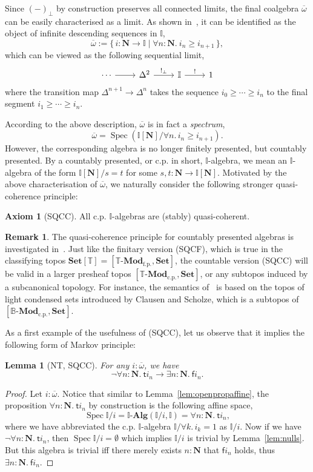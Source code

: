 \documentclass[12pt]{amsart}
\newtheorem{lemma}[theorem]{Lemma}
\theoremstyle{definition}
\newtheorem{remark}[theorem]{Remark}
\newtheorem{axiom}{Axiom}
\newcommand{\mb}[1]{\mathbf{#1}}
\newcommand{\mbb}[1]{\mathbb{#1}}
\newcommand{\T}{\mbb T}
\newcommand{\I}{\mbb I}
\newcommand{\mr}[1]{\mathrm{#1}}
\newcommand{\ms}[1]{\mathsf{#1}}
\newcommand{\Set}{\mb{Set}}
\newcommand{\alg}{\text{-}\mb{Alg}}
\newcommand{\ov}[1]{\overline{#1}}
\newcommand{\scomp}[2]{\{\,#1\mid#2\,\}}
\newcommand{\fp}{_{\mr{f.p.}}}
\newcommand{\cp}{_{\mr{c.p.}}}
\newcommand{\N}{\mb N}
\newcommand{\prt}{_{\bot}}
\newcommand{\fa}[2]{\forall #1\!\colon\!\!#2.\ }
\newcommand{\ex}[2]{\exists #1\!\colon\!\!#2.\ }
\newcommand{\emp}{\emptyset}
\newcommand{\mmod}[1]{#1\text{-}\mathbf{Mod}}
\newcommand{\spec}{\operatorname{Spec}}
\begin{document}
Since $(-)\prt$ by construction preserves all connected limits, the final coalgebra $\ov\omega$ can be easily characterised as a limit. As shown in~\cite{hyland2006first}, it can be identified as the object of infinite descending sequences in $\I$,
\[ \ov\omega := \scomp{i : \N \to \I}{\fa n\N i_n \ge i_{n+1}}, \]
which can be viewed as the following sequential limit,
\[
\begin{tikzcd}
  \cdots \ar[r] & \Delta^2 \ar[r, "!\prt"] & \I \ar[r, "!"] & 1
\end{tikzcd}
\]
where the transition map $\Delta^{n+1} \to \Delta^n$ takes the sequence $i_0 \ge \cdots \ge i_n$ to the final segment $i_1 \ge \cdots \ge i_n$. 

According to the above description, $\ov\omega$ is in fact a \emph{spectrum},
\[ \ov\omega = \spec(\I[\N]/\forall n.\, i_n \ge i_{n+1}). \]
However, the corresponding algebra is no longer finitely presented, but countably presented. By a countably presented, or c.p. in short, $\I$-algebra, we mean an $\I$-algebra of the form $\I[\N]/s=t$ for some $s,t : \N \to \I[\N]$. Motivated by the above characterisation of $\ov\omega$, we naturally consider the following stronger quasi-coherence principle:

\begin{axiom}[SQCC]
  All c.p. $\I$-algebras are (stably) quasi-coherent.
\end{axiom}

\begin{remark}
  The quasi-coherence principle for countably presented algebras is investigated in~\cite{cherubini2024foundation}. Just like the finitary version (SQCF), which is true in the classifying topos $\Set[\T] = [\mmod\T\fp,\Set]$, the countable version (SQCC) will be valid in a larger presheaf topos $[\mmod\T\cp,\Set]$, or any subtopos induced by a subcanonical topology. For instance, the semantics of~\cite{cherubini2024foundation} is based on the topos of light condensed sets introduced by Clausen and Scholze, which is a subtopos of $[\mmod{\mbb B}\cp,\Set]$.
\end{remark}

As a first example of the usefulness of (SQCC), let us observe that it implies the following form of Markov principle:

\begin{lemma}[NT, SQCC]\label{lem:markov}
  For any $i : \ov\omega$, we have
  \[ \neg\fa{n}{\N}\ms ti_n \to \ex n\N\ms fi_n. \]
\end{lemma}
\begin{proof}
  Let $i : \ov\omega$. Notice that similar to Lemma~\ref{lem:openpropaffine}, the proposition $\fa n\N \ms ti_n$ by construction is the following affine space, 
  \[ \spec\I/i = \I\alg(\I/i,\I) = \fa n\N \ms ti_n, \]
  where we have abbreviated the c.p. $\I$-algebra $\I/\forall k.\, i_k = 1$ as $\I/i$. Now if we have $\neg\fa n\N \ms ti_n$, then $\spec\I/i = \emp$ which implies $\I/i$ is trivial by Lemma~\ref{lem:nulls}. But this algebra is trivial iff there merely exists $n : \N$ that $\ms fi_n$ holds, thus $\ex n\N \ms fi_n$.
\end{proof}
\end{document}

